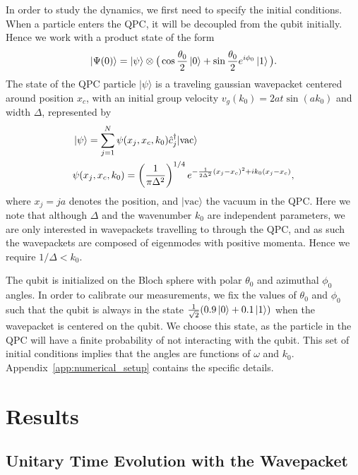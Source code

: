 \documentclass[10pt,
 amsmath,amssymb,
 aps,prb, twocolumn
]{revtex4-2}
\newcommand\sj[1]{ {\color{cyan} #1} }
\begin{document}
\sj{In order to study the dynamics, we first need to specify the initial conditions. When a particle enters the QPC, it will be decoupled from the qubit initially. Hence we work with a product state of the form
\begin{align}\label{eq:initial_state}
    \ket{\Psi(0)} = \ket{\psi}\otimes\big(\cos{\frac{\theta_0}{2}}\ket{0}+\sin{\frac{\theta_0}{2}}e^{i\phi_0}\ket{1}\big).
\end{align}
The state of  the QPC particle \mbox{$|\psi\rangle$}  is a traveling gaussian wavepacket centered around position \mbox{$x_c$}, with an initial group velocity \mbox{$v_g(k_0) = 2 a t\sin(a k_0)$} and width \mbox{$\Delta$}, represented by
\begin{subequations}\label{eq:gauss_wavepacket}
    \begin{align}
    &\ket{\psi} = \sum_{j=1}^N\psi(x_j,x_c,k_0) \hat{c}_j^{\dagger}|\text{vac}\rangle \\
    &\psi(x_j,x_c,k_0) = \left(\frac{1}{\pi \Delta^2}\right)^{1 / 4} e^{-\frac{1}{2 \Delta^2}\left(x_j-x_c\right)^2+i k_0\left(x_j-x_c\right)},
\end{align}
\end{subequations}
where \mbox{$x_j= j a$} denotes the position, and \mbox{$|\text{vac}\rangle$} the vacuum in the QPC. Here we note that although \mbox{$\Delta$} and the wavenumber \mbox{$k_0$} are independent parameters, we are only interested in wavepackets travelling to through the QPC, and as such the wavepackets are composed of eigenmodes with positive momenta. Hence we require \mbox{$1/\Delta<k_0$}.

The qubit is initialized on the Bloch sphere with polar \mbox{$\theta_0$} and azimuthal \mbox{$\phi_0$} angles. In order to calibrate our measurements, we fix the values of \mbox{$\theta_0$} and \mbox{$\phi_0$} such that the qubit is always in the state \mbox{$\frac{1}{\sqrt{2}}(0.9\ket{0} + 0.1\ket{1})$} when the wavepacket is centered on the qubit. We choose this state, as the particle in the QPC will have a finite probability of not interacting with the qubit.
This set of initial conditions implies that the angles are functions of  \mbox{$\omega$} and \mbox{$k_0$}. Appendix~\ref{app:numerical_setup} contains the specific details.}
 
\section{Results}\label{sect:results}

\subsection{Unitary Time Evolution with the Wavepacket}\label{sect:unitary_evolution}
\end{document}
